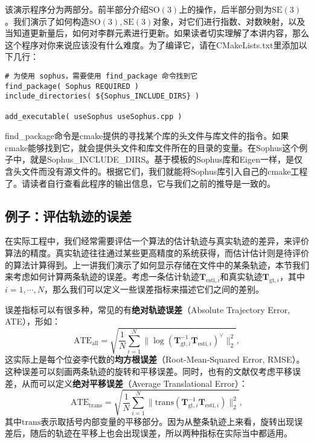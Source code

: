 该演示程序分为两部分。前半部分介绍$\mathrm{SO}(3)$上的操作，后半部分则为$\mathrm{SE}(3)$。我们演示了如何构造$\mathrm{SO}(3),\mathrm{SE}(3)$对象，对它们进行指数、对数映射，以及当知道更新量后，如何对李群元素进行更新。如果读者切实理解了本讲内容，那么这个程序对你来说应该没有什么难度。为了编译它，请在CMakeLists.txt里添加以下几行：

\begin{lstlisting}[caption=slambook/ch4/useSophus/CMakeLists.txt]
# 为使用 sophus，需要使用 find_package 命令找到它
find_package( Sophus REQUIRED )
include_directories( ${Sophus_INCLUDE_DIRS} )

add_executable( useSophus useSophus.cpp )
\end{lstlisting}

find\_package命令是cmake提供的寻找某个库的头文件与库文件的指令。如果cmake能够找到它，就会提供头文件和库文件所在的目录的变量。在Sophus这个例子中，就是Sophus\_INCLUDE\_DIRS。基于模板的Sophus库和Eigen一样，是仅含头文件而没有源文件的。根据它们，我们就能将Sophus库引入自己的cmake工程了。请读者自行查看此程序的输出信息，它与我们之前的推导是一致的。

\subsection{例子：评估轨迹的误差}
在实际工程中，我们经常需要评估一个算法的估计轨迹与真实轨迹的差异，来评价算法的精度。真实轨迹往往通过某些更高精度的系统获得，而估计估计则是待评价的算法计算得到。上一讲我们演示了如何显示存储在文件中的某条轨迹，本节我们来考虑如何计算两条轨迹的误差。考虑一条估计轨迹$\bm{T}_{\mathrm{esti},i}$和真实轨迹$\bm{T}_{\mathrm{gt},i}$，其中$i=1,\cdots,N$，那么我们可以定义一些误差指标来描述它们之间的差别。

误差指标可以有很多种，常见的有\textbf{绝对轨迹误差}（Absolute Trajectory Error, ATE），形如：
\begin{equation}
\mathrm{ATE}_{\mathrm{all}} = \sqrt{ \frac{1}{N} \sum_{i=1}^N \| \log( \bm{T}_{\mathrm{gt},i}^{-1} \bm{T}_{\mathrm{esti},i} )^{\vee} \|_2^2},
\end{equation}
这实际上是每个位姿李代数的\textbf{均方根误差}（Root-Mean-Squared Error, RMSE）。这种误差可以刻画两条轨迹的旋转和平移误差。同时，也有的文献仅考虑平移误差\cite{Sturm2012}，从而可以定义\textbf{绝对平移误差}（Average Translational Error）：
\begin{equation}
	\mathrm{ATE}_{\mathrm{trans}} = \sqrt{ \frac{1}{N} \sum_{i=1}^N \| \mathrm{trans}( \bm{T}_{\mathrm{gt},i}^{-1} \bm{T}_{\mathrm{esti},i} ) \|_2^2},
\end{equation}
其中$\mathrm{trans}$表示取括号内部变量的平移部分。因为从整条轨迹上来看，旋转出现误差后，随后的轨迹在平移上也会出现误差，所以两种指标在实际当中都适用。

